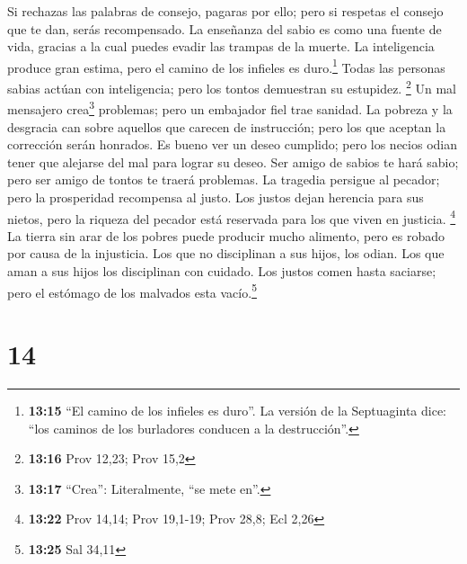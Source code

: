  Si rechazas las palabras de consejo, pagaras por ello;
pero si respetas el consejo que te dan, serás recompensado.
 La enseñanza del sabio es como una fuente de vida,
gracias a la cual puedes evadir las trampas de la muerte.
 La inteligencia produce gran estima, pero el camino de
los infieles es duro.\footnote{\textbf{13:15} ``El camino de los
  infieles es duro''. La versión de la Septuaginta dice: ``los caminos
  de los burladores conducen a la destrucción''.}  Todas
las personas sabias actúan con inteligencia; pero los tontos demuestran
su estupidez. \footnote{\textbf{13:16} Prov 12,23; Prov 15,2}
 Un mal mensajero crea\footnote{\textbf{13:17} ``Crea'':
  Literalmente, ``se mete en''.} problemas; pero un embajador fiel trae
sanidad.  La pobreza y la desgracia can sobre aquellos
que carecen de instrucción; pero los que aceptan la corrección serán
honrados.  Es bueno ver un deseo cumplido; pero los
necios odian tener que alejarse del mal para lograr su deseo.
 Ser amigo de sabios te hará sabio; pero ser amigo de
tontos te traerá problemas.  La tragedia persigue al
pecador; pero la prosperidad recompensa al justo.  Los
justos dejan herencia para sus nietos, pero la riqueza del pecador está
reservada para los que viven en justicia. \footnote{\textbf{13:22} Prov
  14,14; Prov 19,1-19; Prov 28,8; Ecl 2,26}  La tierra
sin arar de los pobres puede producir mucho alimento, pero es robado por
causa de la injusticia.  Los que no disciplinan a sus
hijos, los odian. Los que aman a sus hijos los disciplinan con cuidado.
 Los justos comen hasta saciarse; pero el estómago de los
malvados esta vacío.\footnote{\textbf{13:25} Sal 34,11}

\hypertarget{section-13}{%
\section{14}\label{section-13}}

